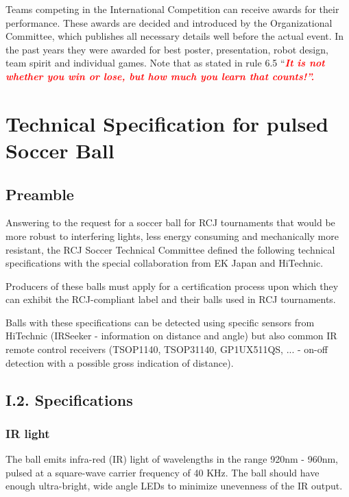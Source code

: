 \documentclass{article}
\begin{document}
Teams competing in the International Competition can receive awards for their
performance. These awards are decided and introduced by the Organizational
Committee, which publishes all necessary details well before the actual event.
In the past years they were awarded for best poster, presentation, robot
design, team spirit and individual games. Note that as stated in rule 6.5
``\textbf{\textit{\textcolor{red}{It is not whether you win or lose, but how
much you learn that counts!''.}}}

\appendix
\section{Technical Specification for pulsed Soccer Ball\label{ref-pulsed-spec}}

\subsection{Preamble}

Answering to the request for a soccer ball for RCJ tournaments that would be
more robust to interfering lights, less energy consuming and mechanically more
resistant, the RCJ Soccer Technical Committee defined the following technical
specifications with the special collaboration from EK Japan and HiTechnic.

Producers of these balls must apply for a certification process upon which they
can exhibit the RCJ-compliant label and their balls used in RCJ tournaments.

Balls with these specifications can be detected using specific sensors from
HiTechnic (IRSeeker - information on distance and angle) but also common IR
remote control receivers (TSOP1140, TSOP31140, GP1UX511QS, ... - on-off
detection with a possible gross indication of distance).

\subsection{I.2. Specifications}

\subsubsection{IR light}

The ball emits infra-red (IR) light of wavelengths in the range 920nm - 960nm,
pulsed at a square-wave carrier frequency of 40 KHz. The ball should have
enough ultra-bright, wide angle LEDs to minimize unevenness of the IR output.
\end{document}
